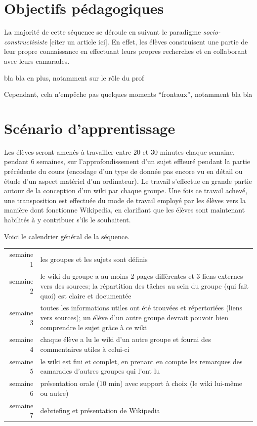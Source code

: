 \documentclass[11pt,bibliography=totoc]{scrartcl}
\begin{document}
\section{Objectifs pédagogiques}
La majorité de cette séquence se déroule en suivant le paradigme
\textit{socio-constructiviste} [citer un article ici]. En effet, les élèves
construisent une partie de leur propre connaissance en effectuant leurs propres
recherches et en collaborant avec leurs camarades.

bla bla en plus, notamment sur le rôle du prof

Cependant, cela n'empêche pas quelques moments ``frontaux'', notamment bla bla 

\section{Scénario d'apprentissage}
Les élèves seront amenés à travailler entre 20 et 30 minutes chaque semaine,
pendant 6 semaines, sur l'approfondissement d'un sujet effleuré pendant la
partie précédente du cours (encodage d'un type de donnée pas encore vu en détail
ou étude d'un aspect matériel d'un ordinateur). Le travail s'effectue en grande
partie autour de la conception d'un wiki par chaque groupe. Une fois ce travail
achevé, une transposition est effectuée du mode de travail employé par les
élèves vers la manière dont fonctionne Wikipedia, en clarifiant que les élèves
sont maintenant habilités à y contribuer s'ils le souhaitent.

Voici le calendrier général de la séquence.
\begin{center}
\begin{tabular}{rp{}}
  semaine 1& les groupes et les sujets sont définis\\
  semaine 2& le wiki du groupe a au moins 2 pages différentes et 3 liens
              externes vers des sources;
              la répartition des tâches au sein du groupe (qui fait quoi) est claire et documentée\\
  semaine 3& toutes les informations utiles ont été trouvées et répertoriées
              (liens vers sources);
              un élève d'un autre groupe devrait pouvoir bien comprendre le sujet grâce à ce wiki\\
  semaine 4& chaque élève a lu le wiki d'un autre groupe et fourni des commentaires utiles à celui-ci\\
  semaine 5& le wiki est fini et complet, en prenant en compte les remarques des
             camarades d'autres groupes qui l'ont lu\\
  semaine 6& présentation orale (10 min) avec support à choix (le wiki lui-même
             ou autre)\\
  semaine 7& debriefing et présentation de Wikipedia
\end{tabular}  
\end{center}
\end{document}
